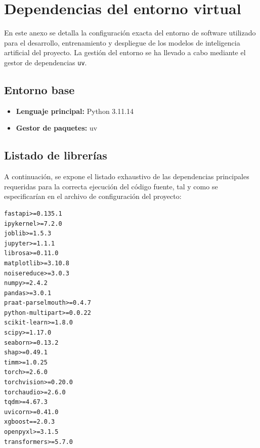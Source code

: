 \chapter{Dependencias del entorno virtual}
\label{app:anexo_entorno} 

En este anexo se detalla la configuración exacta del entorno de software utilizado para el desarrollo, entrenamiento y despliegue de los modelos de inteligencia artificial del proyecto. La gestión del entorno se ha llevado a cabo mediante el gestor de dependencias \texttt{uv}.

\section*{Entorno base}
\begin{itemize}
    \item \textbf{Lenguaje principal:} Python 3.11.14
    \item \textbf{Gestor de paquetes:} uv
\end{itemize}

\section*{Listado de librerías}
A continuación, se expone el listado exhaustivo de las dependencias principales requeridas para la correcta ejecución del código fuente, tal y como se especificarían en el archivo de configuración del proyecto:

\begin{verbatim}
fastapi>=0.135.1
ipykernel>=7.2.0
joblib>=1.5.3
jupyter>=1.1.1
librosa>=0.11.0
matplotlib>=3.10.8
noisereduce>=3.0.3
numpy>=2.4.2
pandas>=3.0.1
praat-parselmouth>=0.4.7
python-multipart>=0.0.22
scikit-learn>=1.8.0
scipy>=1.17.0
seaborn>=0.13.2
shap>=0.49.1
timm>=1.0.25
torch>=2.6.0
torchvision>=0.20.0
torchaudio>=2.6.0
tqdm>=4.67.3
uvicorn>=0.41.0
xgboost==2.0.3
openpyxl>=3.1.5
transformers>=5.7.0
\end{verbatim}